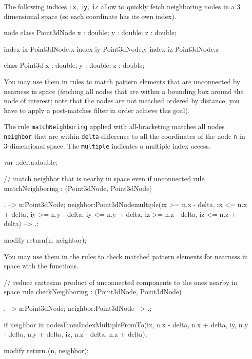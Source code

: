 \begin{example}\label{ex:spatialquery}
The following indices \texttt{ix}, \texttt{iy}, \texttt{iz} allow to quickly fetch neighboring nodes in a 3 dimensional space (so each coordinate has its own index).

\begin{grgen}
node class Point3dNode {
  x : double;
  y : double;
  z : double;
}

index ix { Point3dNode.x }
index iy { Point3dNode.y }
index iz { Point3dNode.z }

class Point3d {
  x : double;
  y : double;
  z : double;
}
\end{grgen}

You may use them in rules to match pattern elements that are unconnected by nearness in space (fetching all nodes that are within a bounding box around the node of interest; note that the nodes are not matched ordered by distance, you have to apply a post-matches filter in order achieve this goal).

The rule \texttt{matchNeighboring} applied with all-bracketing matches all nodes \texttt{neighbor} that are within
\texttt{delta}-difference to all the coordinates of the node \texttt{n} in $3$-dimensional space.
The \texttt{multiple} indicates a multiple index access.

\begin{grgen}
var ::delta:double;

// match neighbor that is nearby in space even if unconnected
rule matchNeighboring : (Point3dNode, Point3dNode) {
  . --> n:Point3dNode;
  neighbor:Point3dNode{multiple(ix >= n.x - delta, ix <= n.x + delta, iy >= n.y - delta, iy <= n.y + delta, iz >= n.z - delta, iz <= n.z + delta)} --> .;

  modify {
    return(n, neighbor);
  }
}
\end{grgen}

You may use them in the rules to check matched pattern elements for nearness in space with the functions.

\begin{grgen}
// reduce cartesian product of unconnected components to the ones nearby in space
rule checkNeighboring : (Point3dNode, Point3dNode) {
  . --> n:Point3dNode;
  neighbor:Point3dNode --> .;

  if {
    neighbor in nodesFromIndexMultipleFromTo(ix, n.x - delta, n.x + delta, iy, n.y - delta, n.y + delta, iz, n.z - delta, n.z + delta);
  }

  modify {
    return (n, neighbor);
  }
}
\end{grgen}

\end{example}


